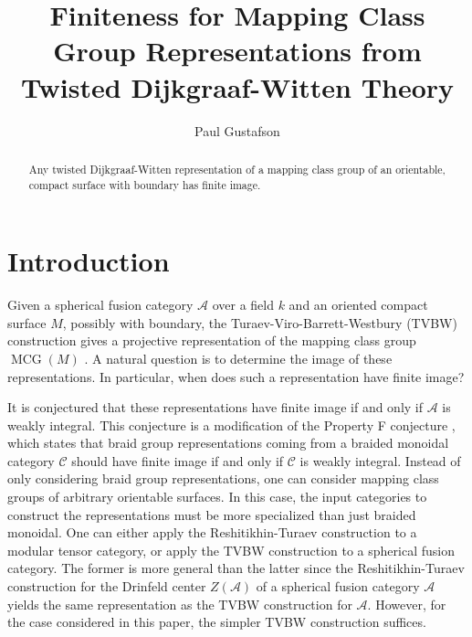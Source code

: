 \documentclass{amsart}
\DeclareMathOperator{\MCG}{MCG}
\begin{document}
\title{Finiteness for Mapping Class Group Representations from Twisted Dijkgraaf-Witten Theory}


\author{Paul Gustafson}
\address{Department of Mathematics,
    Texas A\&M University,
    College Station, TX
    U.S.A.}
    

\begin{abstract}
Any twisted Dijkgraaf-Witten representation of a mapping class group of an orientable, compact surface with boundary has finite image.
\end{abstract}

\maketitle

\section{Introduction}
Given a spherical fusion category $\mathcal A$ over a field $k$ and an oriented compact surface $M$, possibly with boundary, the Turaev-Viro-Barrett-Westbury (TVBW) construction gives a projective representation of the mapping class group $\MCG(M)$ \cite{TURAEV1992865, hep-th/9311155}.  A natural question is to determine the image of these representations.  In particular,  when does such a representation have finite image?

It is conjectured that these representations have finite image if and only if  $\mathcal A$ is weakly integral.  This conjecture is a modification of the Property F conjecture \cite{nr, erw}, which states that braid group representations coming from a braided monoidal category $\mathcal C$ should have finite image if and only if $\mathcal C$ is weakly integral. Instead of only considering braid group representations, one can consider mapping class groups of arbitrary orientable surfaces.  In this case, the input categories to construct the representations must be more specialized than just braided monoidal.  One can either apply the Reshitikhin-Turaev construction to a modular tensor category, or apply the TVBW construction to a spherical fusion category.  The former is more general than the latter since the Reshitikhin-Turaev construction for the Drinfeld center $Z(\mathcal A)$ of a spherical fusion category $\mathcal A$ yields the same representation as the TVBW construction for $\mathcal A$.  However, for the case considered in this paper, the simpler TVBW construction suffices.
\end{document}
